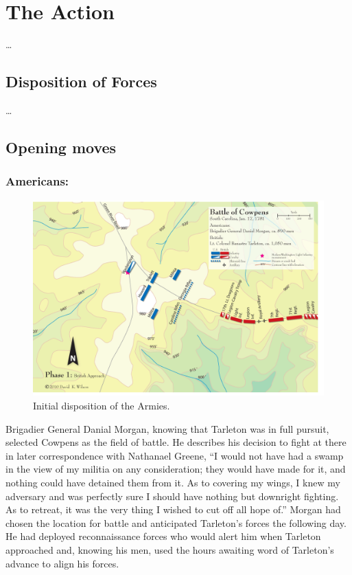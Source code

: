 \section{The Action}

\ldots

\subsection{Disposition of Forces}

\ldots

\subsection{Opening moves}

\subsubsection{Americans:}

\begin{figure}[h]
    \begin{center}
    \includegraphics[width=\textwidth]{gfx/beiber01}
    \end{center}
    \caption{Initial disposition of the Armies.\cite{wilson_blogmap}}
    \label{terrain1}
\end{figure}

Brigadier General Danial Morgan, knowing that Tarleton was in full pursuit,
selected Cowpens as the field of battle. He describes his decision to fight at
there in later correspondence with Nathanael Greene, ``I would not have had a
swamp in the view of my militia on any consideration; they would have made for
it, and nothing could have detained them from it. As to covering my wings, I
knew my adversary and was perfectly sure I should have nothing but downright
fighting. As to retreat, it was the very thing I wished to cut off all hope of.''
\cite[46]{moncure_cowpens_1996} Morgan had chosen the location for battle and anticipated
Tarleton's forces the following day. He had deployed reconnaissance forces who
would alert him when Tarleton approached and, knowing his men, used the hours
awaiting word of Tarleton's advance to align his forces.

